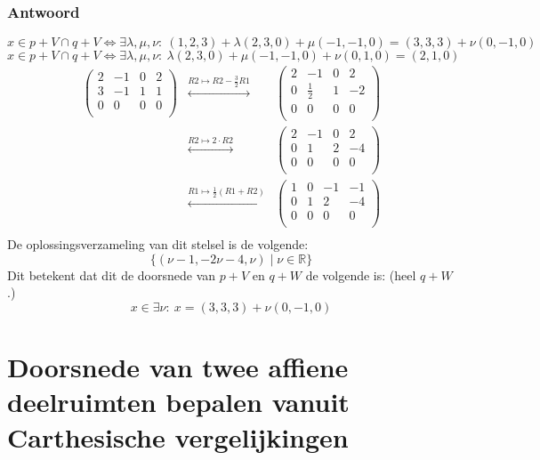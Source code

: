 \documentclass[main.tex]{subfiles}
\begin{document}
\subsubsection*{Antwoord}
\[
x\in p+V\cap q+V \Leftrightarrow \exists \lambda, \mu, \nu:\ (1,2,3) + \lambda (2,3,0) + \mu (-1,-1,0) = (3,3,3) + \nu (0,-1,0)
\]
\[
x\in p+V\cap q+V \Leftrightarrow \exists \lambda, \mu, \nu:\ 
\lambda (2,3,0) + \mu (-1,-1,0) + \nu (0,1,0) = (2,1,0)
\]
\[
\begin{array}{rcc}
  \left(
    \begin{array}{ccc|c}
      2 & -1 & 0 & 2\\
      3 & -1 & 1 & 1\\
      0 & 0 & 0 & 0\\
    \end{array}
  \right)
  &\overset{R2 \mapsto R2-\frac{3}{2}R1}{\longleftrightarrow}&
  \left(
    \begin{array}{ccc|c}
      2 & -1 & 0 & 2\\
      0 & \frac{1}{2} & 1 & -2\\
      0 & 0 & 0 & 0\\
    \end{array}
  \right)
  \\
  &\overset{R2 \mapsto 2\cdot R2}{\longleftrightarrow}&
  \left(
    \begin{array}{ccc|c}
      2 & -1 & 0 & 2\\
      0 & 1 & 2 & -4\\
      0 & 0 & 0 & 0\\
    \end{array}
  \right)\\
  &\overset{R1 \mapsto \frac{1}{2}(R1+R2)}{\longleftrightarrow}&
  \left(
    \begin{array}{ccc|c}
      1 & 0 & -1 & -1\\
      0 & 1 & 2 & -4\\
      0 & 0 & 0 & 0\\
    \end{array}
  \right)\\
\end{array}
\]
De oplossingsverzameling van dit stelsel is de volgende:
\[
\{ (\nu-1,-2\nu-4,\nu) \mid \nu \in \mathbb{R} \}
\]
Dit betekent dat dit de doorsnede van $p+V$ en $q+W$ de volgende is: (heel $q+W$.)
\[ x\in \exists \nu:\ x = (3,3,3) + \nu (0,-1,0) \]

\newpage
\section{Doorsnede van twee affiene deelruimten bepalen vanuit Carthesische vergelijkingen}
\end{document}

